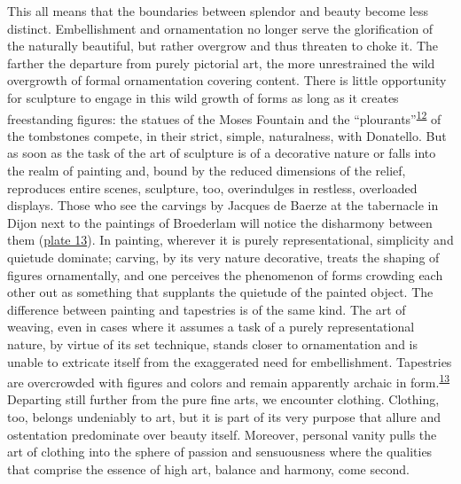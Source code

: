 This all means that the boundaries between splendor and beauty become
less distinct. Embellishment and ornamentation no longer serve the
glorification of the naturally beautiful, but rather overgrow and thus
threaten to choke it. The farther the departure from purely pictorial
art, the more unrestrained the wild overgrowth of formal ornamentation
covering content. There is little opportunity for sculpture to engage in
this wild growth of forms as long as it creates freestanding figures:
the statues of the Moses Fountain and the
``plourants''\textsuperscript{\protect\hypertarget{20_ILLUSTRATIONS_FOLLOW_PAGE.xhtmlux5cux23id_449}{\protect\hyperlink{23_NOTES.xhtmlux5cux23id_450}{12}}}
of the tombstones compete, in their strict, simple, naturalness, with
Donatello. But as soon as the task of the art of sculpture is of a
decorative nature or falls into the realm of painting and, bound by the
reduced dimensions of the relief, reproduces entire scenes, sculpture,
too, overindulges in restless, overloaded displays. Those who see the
carvings by Jacques de Baerze at the tabernacle in Dijon next to the
paintings of Broederlam will notice the disharmony between them
(\protect\hyperlink{20_ILLUSTRATIONS_FOLLOW_PAGE.xhtmlux5cux23id_14}{plate
13}). In painting, wherever it is purely representational, simplicity
and quietude dominate; carving, by its very nature decorative, treats
the shaping of figures ornamentally, and one perceives the phenomenon of
forms crowding each other out as something that supplants the quietude
of the painted object. The difference between painting and tapestries is
of the same kind. The art of weaving, even in cases where it assumes a
task of a purely representational nature, by virtue of its set
technique, stands closer to ornamentation and is unable to extricate
itself from the exaggerated need for embellishment. Tapestries are
overcrowded with figures and colors and remain apparently archaic in
form.\textsuperscript{\protect\hypertarget{20_ILLUSTRATIONS_FOLLOW_PAGE.xhtmlux5cux23id_447}{\protect\hyperlink{23_NOTES.xhtmlux5cux23id_448}{13}}}
Departing still further from the pure fine arts, we encounter clothing.
Clothing, too, belongs undeniably to art, but it is part of its very
purpose that allure and ostentation predominate over beauty itself.
Moreover, personal vanity pulls the art of clothing into the sphere of
passion and sensuousness where the qualities that comprise the essence
of high art, balance and harmony, come second.

